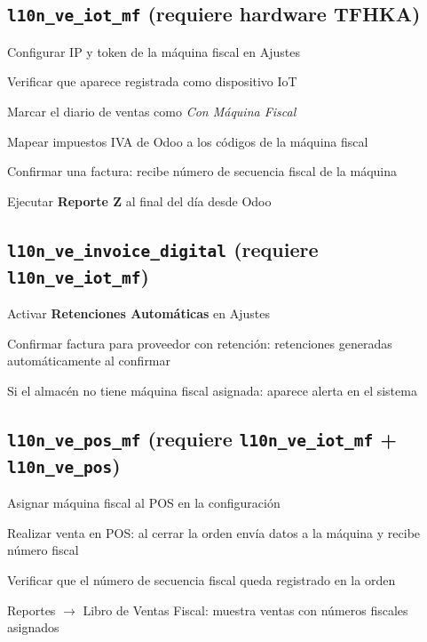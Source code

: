 \documentclass[11pt,a4paper]{article}
\newcommand{\modulo}[1]{\texttt{\textcolor{naranja}{#1}}}
\begin{document}
\begin{Form}
\subsection{\modulo{l10n\_ve\_iot\_mf} (requiere hardware TFHKA)}

\begin{checklist}
  \item Configurar IP y token de la máquina fiscal en Ajustes
  \item Verificar que aparece registrada como dispositivo IoT
  \item Marcar el diario de ventas como \emph{Con Máquina Fiscal}
  \item Mapear impuestos IVA de Odoo a los códigos de la máquina fiscal
  \item Confirmar una factura: recibe número de secuencia fiscal de la máquina
  \item Ejecutar \textbf{Reporte Z} al final del día desde Odoo
\end{checklist}

\subsection{\modulo{l10n\_ve\_invoice\_digital} (requiere \modulo{l10n\_ve\_iot\_mf})}

\begin{checklist}
  \item Activar \textbf{Retenciones Automáticas} en Ajustes
  \item Confirmar factura para proveedor con retención: retenciones generadas automáticamente al confirmar
  \item Si el almacén no tiene máquina fiscal asignada: aparece alerta en el sistema
\end{checklist}

\subsection{\modulo{l10n\_ve\_pos\_mf} (requiere \modulo{l10n\_ve\_iot\_mf} + \modulo{l10n\_ve\_pos})}

\begin{checklist}
  \item Asignar máquina fiscal al POS en la configuración
  \item Realizar venta en POS: al cerrar la orden envía datos a la máquina y recibe número fiscal
  \item Verificar que el número de secuencia fiscal queda registrado en la orden
  \item Reportes $\rightarrow$ Libro de Ventas Fiscal: muestra ventas con números fiscales asignados
\end{checklist}

\end{Form}
\end{document}
